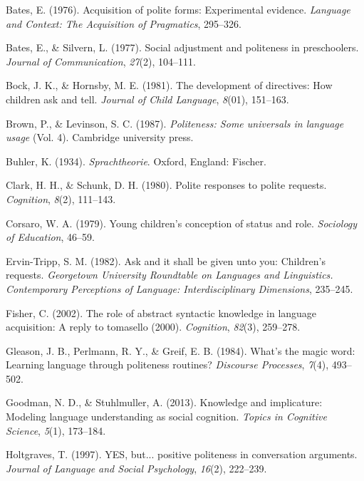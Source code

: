 \documentclass[10pt, letterpaper]{article}
\begin{document}
\hypertarget{ref-bates1976}{}
Bates, E. (1976). Acquisition of polite forms: Experimental evidence.
\emph{Language and Context: The Acquisition of Pragmatics}, 295--326.

\hypertarget{ref-bates1977}{}
Bates, E., \& Silvern, L. (1977). Social adjustment and politeness in
preschoolers. \emph{Journal of Communication}, \emph{27}(2), 104--111.

\hypertarget{ref-bock1981}{}
Bock, J. K., \& Hornsby, M. E. (1981). The development of directives:
How children ask and tell. \emph{Journal of Child Language},
\emph{8}(01), 151--163.

\hypertarget{ref-brown1987}{}
Brown, P., \& Levinson, S. C. (1987). \emph{Politeness: Some universals
in language usage} (Vol. 4). Cambridge university press.

\hypertarget{ref-buhler1934}{}
Buhler, K. (1934). \emph{Sprachtheorie}. Oxford, England: Fischer.

\hypertarget{ref-clark1980}{}
Clark, H. H., \& Schunk, D. H. (1980). Polite responses to polite
requests. \emph{Cognition}, \emph{8}(2), 111--143.

\hypertarget{ref-corsaro1979}{}
Corsaro, W. A. (1979). Young children's conception of status and role.
\emph{Sociology of Education}, 46--59.

\hypertarget{ref-ervin1982}{}
Ervin-Tripp, S. M. (1982). Ask and it shall be given unto you:
Children's requests. \emph{Georgetown University Roundtable on Languages
and Linguistics. Contemporary Perceptions of Language: Interdisciplinary
Dimensions}, 235--245.

\hypertarget{ref-fisher2002}{}
Fisher, C. (2002). The role of abstract syntactic knowledge in language
acquisition: A reply to tomasello (2000). \emph{Cognition},
\emph{82}(3), 259--278.

\hypertarget{ref-gleason1984}{}
Gleason, J. B., Perlmann, R. Y., \& Greif, E. B. (1984). What's the
magic word: Learning language through politeness routines?
\emph{Discourse Processes}, \emph{7}(4), 493--502.

\hypertarget{ref-goodman2013}{}
Goodman, N. D., \& Stuhlmuller, A. (2013). Knowledge and implicature:
Modeling language understanding as social cognition. \emph{Topics in
Cognitive Science}, \emph{5}(1), 173--184.

\hypertarget{ref-holtgraves1997}{}
Holtgraves, T. (1997). YES, but... positive politeness in conversation
arguments. \emph{Journal of Language and Social Psychology},
\emph{16}(2), 222--239.
\end{document}
